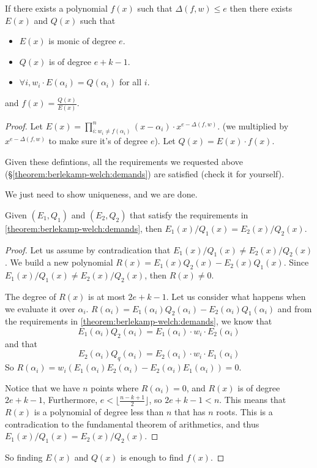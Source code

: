 \begin{theorem}
 If there exists a polynomial $f(x)$ such that $\Delta(f,w)\le e$
 then there exists $E(x)$ and $Q(x)$ such that 

 \begin{itemize}
    \item $E(x)$ is monic of degree $e$.
    \item $Q(x)$ is of degree $e+k-1$.
    \item $\forall i, w_i\cdot E(\alpha_i)=Q(\alpha_i)$ for all $i$.
 \end{itemize}\label{theorem:berlekamp-welch:demands}

 and $f(x)=\frac{Q(x)}{E(x)}$.
\end{theorem}

\begin{proof}
    Let $E(x)=\prod_{i:w_i\ne f(\alpha_i)}^{n} (x-\alpha_i)\cdot x^{e-\Delta(f,w)}$.
    (we multiplied by $x^{e-\Delta(f,w)}$ to make sure it's of degree $e$).
    Let $Q(x)=E(x)\cdot f(x)$.
    
    Given these defintions, all the requirements we requested above 
    (\S\ref{theorem:berlekamp-welch:demands}) are satisfied (check it for yourself).

    We just need to show uniqueness, and we are done.
    \begin{lemma}
        Given $(E_1, Q_1)$ and $(E_2, Q_2)$ that satisfy the requirements in
         \ref{theorem:berlekamp-welch:demands},
        then $E_1(x)/Q_1(x) = E_2(x)/Q_2(x)$.
    \end{lemma}

    \begin{proof}
        Let us assume by contradication that $E_1(x)/Q_1(x) \ne E_2(x)/Q_2(x)$.
        We build a new polynomial  $R(x)=E_1(x)Q_2(x) - E_2(x)Q_1(x)$.
        Since $E_1(x)/Q_1(x) \ne E_2(x)/Q_2(x)$, then $R(x)\ne 0$.

        The degree of $R(x)$ is at most $2e+k-1$. Let us consider what happens when we 
        evaluate it over $\alpha_i$.
        $R(\alpha_i)= E_1(\alpha_i)Q_2(\alpha_i) - E_2(\alpha_i)Q_1(\alpha_i)$
        and from the requirements in \ref{theorem:berlekamp-welch:demands}, we know that
        $$E_1(\alpha_i)Q_2(\alpha_i) = E_1(\alpha_i)\cdot w_i\cdot E_2(\alpha_i)$$
        and that 
        $$E_2(\alpha_i)Q_q(\alpha_i) = E_2(\alpha_i)\cdot w_i\cdot E_1(\alpha_i)$$
        So $R(\alpha_i)= w_i(E_1(\alpha_i)E_2(\alpha_i) - E_2(\alpha_i)E_1(\alpha_i))=0$.

        Notice that we have $n$ points where $R(\alpha_i)=0$, and $R(x)$ is 
        of degree $2e+k-1$,
        Furthermore, $e<\lfloor \frac{n-k+1}{2}\rfloor$, so $2e+k-1<n$.
        This means that $R(x)$ is a polynomial of degree less than $n$ that has $n$ roots.
        This is a contradication to the fundamental theorem of arithmetics,
        and thus $E_1(x)/Q_1(x) = E_2(x)/Q_2(x)$.
    \end{proof}

    So finding $E(x)$ and $Q(x)$ is enough to find $f(x)$.
\end{proof}


